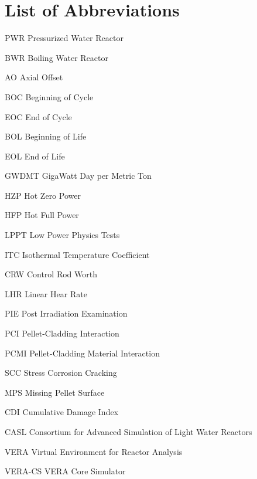 \documentclass[edeposit,fullpage,11pt]{uiucthesis2009}
\begin{document}
\tableofcontents
\listoftables
\listoffigures

\chapter{List of Abbreviations}

\begin{symbollist*}
\item[PWR]     Pressurized Water Reactor
\item[BWR]     Boiling Water Reactor
\item[AO]      Axial Offset
\item[BOC]     Beginning of Cycle
\item[EOC]     End of Cycle
\item[BOL]     Beginning of Life
\item[EOL]     End of Life
\item[GWDMT]   GigaWatt Day per Metric Ton
\item[HZP]     Hot Zero Power
\item[HFP]     Hot Full Power
\item[LPPT]    Low Power Physics Tests
\item[ITC]     Isothermal Temperature Coefficient 
\item[CRW]     Control Rod Worth
\item[LHR]     Linear Hear Rate
\item[PIE]     Post Irradiation Examination
\item[PCI]     Pellet-Cladding Interaction
\item[PCMI]    Pellet-Cladding Material Interaction
\item[SCC]     Stress Corrosion Cracking
\item[MPS]     Missing Pellet Surface
\item[CDI]     Cumulative Damage Index
\item[CASL]    Consortium for Advanced Simulation of Light Water Reactors
\item[VERA]    Virtual Environment for Reactor Analysis
\item[VERA-CS] VERA Core Simulator
\end{symbollist*}

\end{document}
